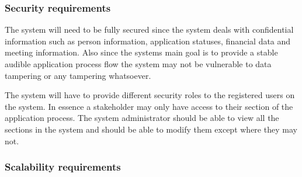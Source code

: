 \documentclass[12pt]{article}
\begin{document}
		\subsubsection{Security requirements}
		
		\begin{flushleft}
		
		The system will need to be fully secured since the system deals with confidential information such as person information, application statuses, financial data and meeting information. Also since the systems main goal is to provide a stable audible application process flow the system may not be vulnerable to data tampering or any tampering whatsoever. \\
		\vspace{0.1in}
		  
		The system will have to provide different security roles to the registered users on the system. In essence a stakeholder may only have access to their section of the application process. The system administrator should be able to view all the sections in the system and should be able to modify them except where they may not.
		
		\end{flushleft}
		
		\vspace{0.1in}
		
		\subsubsection{Scalability requirements}
		
\end{document}
